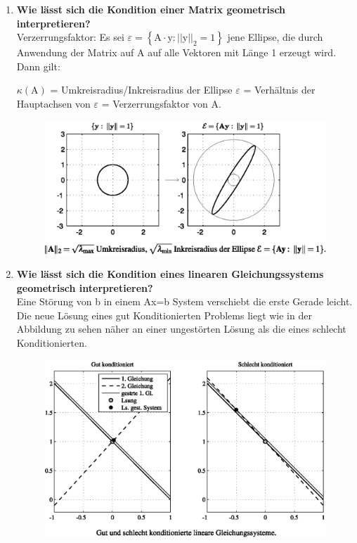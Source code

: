 \begin{enumerate}
		\pagebreak
		
		\item \textbf{Wie lässt sich die Kondition einer Matrix geometrisch interpretieren?} \\
			Verzerrungsfaktor:
			Es sei \(\varepsilon=\left\lbrace \text{A}\cdot\text{y}:||\text{y}||_2=1 \right\rbrace \) jene Ellipse, die durch Anwendung der Matrix auf A auf alle Vektoren mit Länge 1 erzeugt wird. Dann gilt:
			\begin{center}
				\(\kappa(\text{A}) \) = Umkreisradius/Inkreisradius der Ellipse \(\varepsilon\) = Verhältnis der Hauptachsen von \(\varepsilon\) = Verzerrungsfaktor von A.
			\end{center}
			\begin{figure}[htbp]
				\centering
				\includegraphics[width=0.6\linewidth]{kap5_1}
			\end{figure}
		
		
		\item \textbf{Wie lässt sich die Kondition eines linearen Gleichungssystems geometrisch interpretieren?} \\
			Eine Störung von b in einem Ax=b System verschiebt die erste Gerade leicht. Die neue Lösung eines gut Konditionierten Problems liegt wie in der Abbildung zu sehen näher an einer ungestörten Lösung als die eines schlecht Konditionierten.
			\begin{figure}[htbp]
				\centering
				\includegraphics[width=0.6\linewidth]{kap5_2}
			\end{figure}
		

\end{enumerate}
